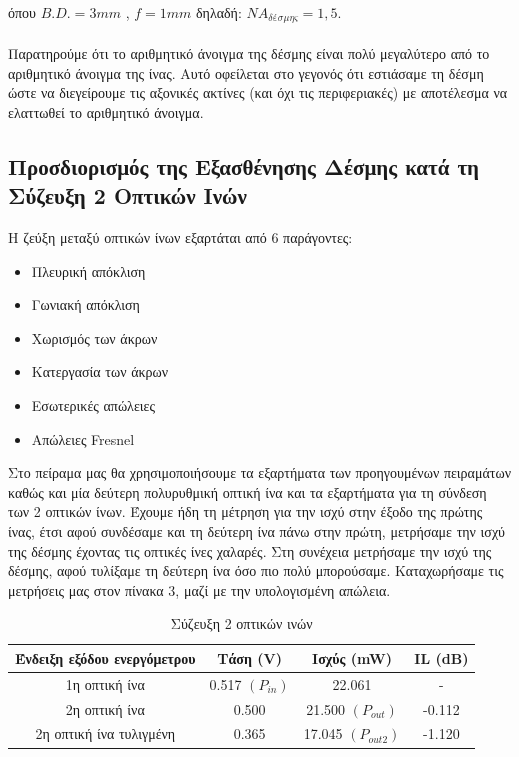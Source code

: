 \documentclass[a4paper,11pt,titlepage]{article}
\begin{document}
όπου $B.D.=3mm$ , $f=1mm$ δηλαδή: $NA_{δέσμης} =1,5$.\\\\

Παρατηρούμε ότι το αριθμητικό άνοιγμα της δέσμης είναι πολύ μεγαλύτερο από το αριθμητικό άνοιγμα της ίνας. Αυτό οφείλεται στο γεγονός ότι εστιάσαμε τη δέσμη ώστε να διεγείρουμε τις αξονικές ακτίνες (και όχι τις περιφεριακές) με αποτέλεσμα να ελαττωθεί το αριθμητικό άνοιγμα.

\newpage

\subsection{Προσδιορισμός της Εξασθένησης Δέσμης κατά τη Σύζευξη 2 Οπτικών Ινών}%

Η ζεύξη μεταξύ οπτικών ίνων εξαρτάται από 6 παράγοντες:
\begin{itemize}
\item Πλευρική απόκλιση 
\item Γωνιακή απόκλιση
\item Χωρισμός των άκρων
\item Κατεργασία των άκρων
\item Εσωτερικές απώλειες
\item Απώλειες Fresnel
\end{itemize}
Στο πείραμα μας θα χρησιμοποιήσουμε τα εξαρτήματα των προηγουμένων πειραμάτων καθώς και μία δεύτερη πολυρυθμική οπτική ίνα και τα εξαρτήματα για τη σύνδεση των 2 οπτικών ίνων. Έχουμε ήδη τη μέτρηση για την ισχύ στην έξοδο της πρώτης ίνας, έτσι αφού συνδέσαμε και τη δεύτερη ίνα πάνω στην πρώτη, μετρήσαμε την ισχύ της δέσμης έχοντας τις οπτικές ίνες χαλαρές. Στη συνέχεια μετρήσαμε την ισχύ της δέσμης, αφού τυλίξαμε τη  δεύτερη ίνα όσο πιο πολύ μπορούσαμε. Καταχωρήσαμε τις μετρήσεις μας στον πίνακα 3, μαζί με την υπολογισμένη απώλεια.

\begin{table} [bph!]
\centering
\begin{tabular}{|c|c|c|c|}
\hline \rule[-2ex]{0pt}{5.5ex} Ένδειξη εξόδου ενεργόμετρου & Τάση (V) & Ισχύς (mW) & IL (dB) \\ 
\hline \rule[-2ex]{0pt}{5.5ex} 1η οπτική ίνα & 0.517 $(P_{in})$  & 22.061 & - \\ 
\hline \rule[-2ex]{0pt}{5.5ex} 2η οπτική ίνα  & 0.500 & 21.500 $(P_{out})$ & -0.112 \\ 
\hline \rule[-2ex]{0pt}{5.5ex} 2η οπτική ίνα τυλιγμένη  & 0.365 & 17.045 $(P_{out2})$ & -1.120 \\ 
\hline 
\end{tabular} 
\caption{Σύζευξη 2 οπτικών ινών}
\end{table}
\end{document}
